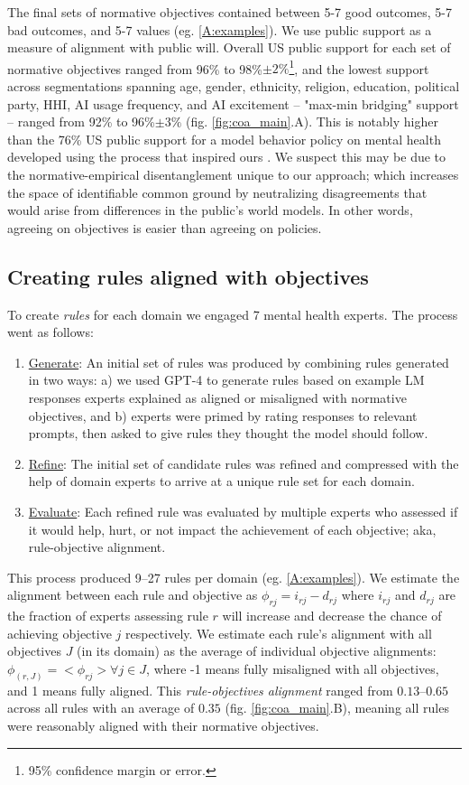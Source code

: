 \documentclass{article}
\begin{document}
The final sets of normative objectives contained between 5-7 good outcomes, 5-7 bad outcomes, and 5-7 values (eg.  \ref{A:examples}).
We use public support as a measure of alignment with public will. Overall US public support for each set of normative objectives ranged from 96\% to 98\%$\pm 2\%$\footnote{95\% confidence margin or error.}, and the lowest support across segmentations spanning age, gender, ethnicity, religion, education, political party, HHI, AI usage frequency, and AI excitement -- "max-min bridging" support -- ranged from 92\% to 96\%$\pm 3\%$ (fig. \ref{fig:coa_main}.A). This is notably higher than the 76\% US public support for a model behavior policy on mental health developed using the process that inspired ours \cite{konya2023democratic}. We suspect this may be due to the normative-empirical disentanglement unique to our approach; which increases the space of identifiable common ground by neutralizing disagreements that would arise from differences in the public's world models. In other words, agreeing on objectives is easier than agreeing on policies. 



\subsection{Creating rules aligned with objectives}
To create \emph{rules} for each domain we engaged 7 mental health experts. The process went as follows:
\begin{enumerate}
    \item \underline{Generate}: An initial set of rules was produced by combining rules generated in two ways: a) we used GPT-4 to generate rules based on example LM responses experts explained as aligned or misaligned with normative objectives, and b) experts were primed by rating responses to relevant prompts, then asked to give rules they thought the model should follow.
    \item \underline{Refine}: The initial set of candidate rules was refined and compressed with the help of domain experts to arrive at a unique rule set for each domain.
    \item \underline{Evaluate}: Each refined rule was evaluated by multiple experts who assessed if it would help, hurt, or not impact the achievement of each  objective; aka, rule-objective alignment.
\end{enumerate}
This process produced 9--27 rules per domain (eg.  \ref{A:examples}). We estimate the alignment between each rule and objective as $\phi_{rj} = i_{rj}-d_{rj}$ where $i_{rj}$ and $d_{rj}$ are the fraction of experts assessing rule $r$ will increase and decrease the chance of achieving objective $j$ respectively. We estimate each rule's alignment with all objectives $J$ (in its domain) as the average of individual objective alignments: $\phi_(r,J)=<\phi_{rj}>\forall j\in J$, where -1 means fully misaligned with all objectives, and 1 means fully aligned. This \emph{rule-objectives alignment} ranged from $0.13$--$0.65$ across all rules with an average of $0.35$ (fig. \ref{fig:coa_main}.B), meaning all rules were reasonably aligned with their normative objectives. 
\end{document}
